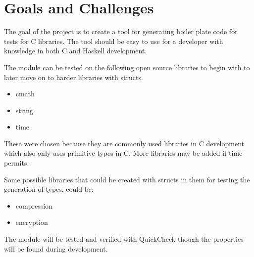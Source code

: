 \section{Goals and Challenges}


The goal of the project is to create a tool for generating boiler plate code for tests for C libraries.
The tool should be easy to use for a developer with knowledge in both C and Haskell development.

The module can be tested on the following open source libraries to begin with to later move on to harder libraries with structs.

\begin{itemize}
  \item cmath
  \item string
  \item time
\end{itemize}

These were chosen because they are commonly used libraries in C development \citep{website:en.wikipedia.org} which also only uses primitive types in C.
More libraries may be added if time permits. %

Some possible libraries that could be created with structs in them for testing the generation of types, could be:

\begin{itemize}
  \item compression
  \item encryption
\end{itemize}

The module will be tested and verified with QuickCheck though the properties will be found during development.
